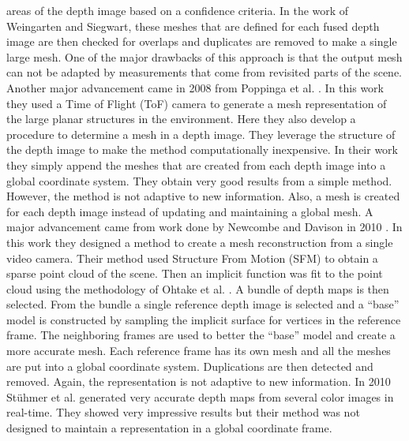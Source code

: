 areas of the depth image based on a confidence criteria. In the work of
Weingarten and Siegwart, these meshes that are defined for each fused depth
image are then checked for overlaps and duplicates are removed to make a single
large mesh. One of the major drawbacks of this approach is that the output mesh
can not be adapted by measurements that come from revisited parts of the scene.
Another major advancement came in 2008 from Poppinga et al. \cite{Poppinga2008}.
In this work they used a Time of Flight (ToF) camera to generate a mesh
representation of the large planar structures in the environment. Here they also
develop a procedure to determine a mesh in a depth image. They leverage the
structure of the depth image to make the method computationally inexpensive. In
their work they simply append the meshes that are created from each depth image
into a global coordinate system. They obtain very good results from a simple
method. However, the method is not adaptive to new information. Also, a mesh is
created for each depth image instead of updating and maintaining a global mesh.
A major advancement came from work done by Newcombe and Davison in 2010
\cite{Newcombe2010}. In this work they designed a method to create a mesh
reconstruction from a single video camera. Their method used Structure From
Motion (SFM) to obtain a sparse point cloud of the scene. Then an implicit
function was fit to the point cloud using the methodology of Ohtake et al.
\cite{Ohtake2003}. A bundle of depth maps is then selected. From the bundle a
single reference depth image is selected and a ``base'' model is constructed by
sampling the implicit surface for vertices in the reference frame. The
neighboring frames are used to better the ``base'' model and create a more
accurate mesh. Each reference frame has its own mesh and all the meshes are put
into a global coordinate system. Duplications are then detected and removed.
Again, the representation is not adaptive to new information. In 2010
St\"{u}hmer et al. \cite{Stuhmer2010} generated very accurate depth maps from
several color images in real-time. They showed very impressive results but their
method was not designed to maintain a representation in a global coordinate
frame.

